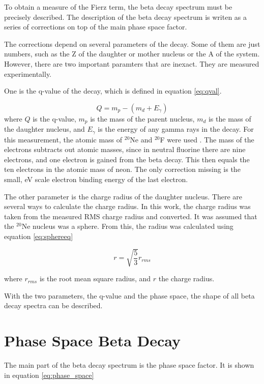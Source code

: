To obtain a measure of the Fierz term, the beta decay spectrum must be precisely described.
The description of the beta decay spectrum is writen as a series of corrections on top of the main phase space factor.  

The corrections depend on several parameters of the decay. 
Some of them are just numbers, such as the Z of the daughter or mother nucleus or the A of the system.
However, there are two important paramters that are inexact.
They are measured experimentally.

One is the q-value of the decay, which is defined in equation \ref{eq:qval}.

\begin{equation}
	Q = m_{p} - (m_{d} + E_{\gamma})
	\label{eq:qval}
\end{equation} 
where $Q$ is the q-value, $m_{p}$ is the mass of the parent nucleus, $m_{d}$ is the mass of the daughter nucleus, and $E_{\gamma}$ is the energy of any gamma rays in the decay.
For this measurement, the atomic mass of $^{20}$Ne and $^{20}$F were used \cite{Pfe12}.
The mass of the electrons subtracts out atomic masses, since in neutral fluorine there are nine electrons, and one electron is gained from the beta decay.
This then equals the ten electrons in the atomic mass of neon.
The only correction missing is the small, eV scale electron binding energy of the last electron.

The other parameter is the charge radius of the daughter nucleus.
There are several ways to calculate the charge radius.
In this work, the charge radius was taken from the measured RMS charge radius and converted.
It was assumed that the $^{20}$Ne nucleus was a sphere. 
From this, the radius was calculated using equation \ref{eq:sphereeq}

\begin{equation}
	r = \sqrt{\frac{5}{3}}r_{rms}	
	\label{eq:sphereeq}
\end{equation}

where $r_{rms}$ is the root mean square radius, and $r$ the charge radius.

With the two parameters, the q-value and the phase space, the shape of all beta decay spectra can be described.

\section{Phase Space Beta Decay}
The main part of the beta decay spectrum is the phase space factor.
It is shown in equation \ref{eq:phase_space}

